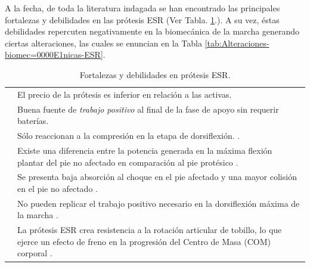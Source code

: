\documentclass[12pt,english]{article}
\providecommand{\tabularnewline}{\\}
\begin{document}
A la fecha, de toda la literatura indagada se han encontrado las principales
fortalezas y debilidades en las prótesis ESR (Ver Tabla. \ref{tab:Fortalezas,-debilidades-ESR}.).
A su vez, éstas debilidades repercuten negativamente en la biomecánica
de la marcha generando ciertas alteraciones, las cuales se enuncian
en la Tabla \ref{tab:Alteraciones-biomec=0000E1nicas-ESR}. 

\begin{center}
\begin{table}[H]
\caption{\label{tab:Fortalezas,-debilidades-ESR}Fortalezas y debilidades en
prótesis ESR.}


\centering{}%
\begin{tabular}{|>{\raggedright}p{3cm}|>{\centering}p{13cm}|}
\hline 
\multirow{2}{3cm}{\textbf{Fortalezas prótesis pasivas}} & El precio de la prótesis es inferior en relación a las activas.\tabularnewline
\cline{2-2} 
 & Buena fuente de \emph{trabajo positivo} al final de la fase de apoyo
sin requerir baterías. \cite{Zelik2014}\tabularnewline
\hline 
\hline 
\multirow{5}{3cm}{\textbf{Debilidades prótesis pasivas}} & Sólo reaccionan a la compresión en la etapa de dorsiflexión. \cite{Varol2010}.\tabularnewline
\cline{2-2} 
 & Existe una diferencia entre la potencia generada en la máxima flexión
plantar del pie no afectado en comparación al pie protésico \cite{Au2009,herr2014powered}.\tabularnewline
\cline{2-2} 
 & Se presenta baja absorción al choque en el pie afectado \cite{Au2008}
y una mayor colisión en el pie no afectado \cite{Morgenroth2011}.\tabularnewline
\cline{2-2} 
 & No pueden replicar el trabajo positivo necesario en la dorsiflexión
máxima de la marcha \cite{Martinez-Villalpando2009,Esposito2015}.\tabularnewline
\cline{2-2} 
 & La prótesis ESR crea resistencia a la rotación articular de tobillo,
lo que ejerce un efecto de freno en la progresión del Centro de Masa
(COM) corporal \cite{DeAsha2014}.\tabularnewline
\hline 
\end{tabular}
\end{table}

\par\end{center}
\end{document}
